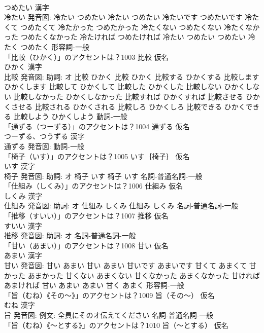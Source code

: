 \documentclass[8pt]{extreport}
\begin{document}
\begin{CJK}{UTF8}{min}
\\	つめたい 漢字　
\\	冷たい 発音図:	冷たい つめたい		冷たい つめたい 冷たいです つめたいです 冷たくて つめたくて 冷たかった つめたかった 冷たくない つめたくない 冷たくなかった つめたくなかった 冷たければ つめたければ 冷たい つめたい つめたい 冷たく つめたく				形容詞-一般 
\\	「比較（ひかく）」のアクセントは？1003	比較 仮名　
\\	ひかく 漢字　
\\	比較 発音図: 助詞: オ	比較 ひかく		比較 ひかく 比較する ひかくする 比較します ひかくします 比較して ひかくして 比較した ひかくした 比較しない ひかくしない 比較しなかった ひかくしなかった 比較すれば ひかくすれば 比較させる ひかくさせる 比較される ひかくされる 比較しろ ひかくしろ 比較できる ひかくできる 比較しよう ひかくしよう				動詞-一般 
\\	「通ずる（つーずる）」のアクセントは？1004	通ずる 仮名　
\\	つーずる、つうずる 漢字　
\\	通ずる 発音図:							動詞-一般 
\\	「椅子（いす）」のアクセントは？1005	いす｛椅子｝ 仮名　
\\	いす 漢字　
\\	椅子 発音図: 助詞: オ	椅子 いす		椅子 いす				名詞-普通名詞-一般 
\\	「仕組み（しくみ）」のアクセントは？1006	仕組み 仮名　
\\	しくみ 漢字　
\\	仕組み 発音図: 助詞: オ	仕組み しくみ		仕組み しくみ				名詞-普通名詞-一般 
\\	「推移（すいい）」のアクセントは？1007	推移 仮名　
\\	すいい 漢字　
\\	推移 発音図: 助詞: オ							名詞-普通名詞-一般 
\\	「甘い（あまい）」のアクセントは？1008	甘い 仮名　
\\	あまい 漢字　
\\	甘い 発音図:	甘い あまい		甘い あまい 甘いです あまいです 甘くて あまくて 甘かった あまかった 甘くない あまくない 甘くなかった あまくなかった 甘ければ あまければ 甘い あまい あまい 甘く あまく				形容詞-一般 
\\	「旨（むね）《その〜》」のアクセントは？1009	旨（その〜） 仮名　
\\	むね 漢字　
\\	旨 発音図: 例文: 全員にそのオ伝えてください							名詞-普通名詞-一般 
\\	「旨（むね）《〜とする》」のアクセントは？1010	旨（〜とする） 仮名　

\end{CJK}
\end{document}
